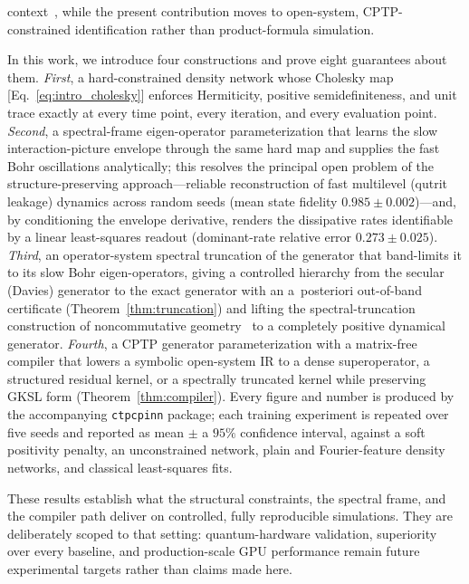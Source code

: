 \documentclass[twocolumn,aps,prxquantum,superscriptaddress,nofootinbib,floatfix,longbibliography]{revtex4-2}
\newcommand{\sync}[1]{#1}
\begin{document}
context~\cite{nguyen2025zassenhaus,jing2026complexity}, while the present contribution moves to open-system, CPTP-constrained identification rather than product-formula simulation.

In this work, we introduce four constructions and prove eight guarantees about them. \emph{First}, a hard-constrained density network whose Cholesky map [Eq.~\eqref{eq:intro_cholesky}] enforces Hermiticity, positive semidefiniteness, and unit trace exactly at every time point, every iteration, and every evaluation point. \emph{Second}, a spectral-frame eigen-operator parameterization that learns the slow interaction-picture envelope through the same hard map and supplies the fast Bohr oscillations analytically; this resolves the principal open problem of the structure-preserving approach---reliable reconstruction of fast multilevel (qutrit leakage) dynamics across random seeds (mean state fidelity $\sync{0.985}\pm\sync{0.002}$)---and, by conditioning the envelope derivative, renders the dissipative rates identifiable by a linear least-squares readout (dominant-rate relative error $\sync{0.273}\pm\sync{0.025}$). \emph{Third}, an operator-system spectral truncation of the generator that band-limits it to its slow Bohr eigen-operators, giving a controlled hierarchy from the secular (Davies) generator to the exact generator with an a~posteriori out-of-band certificate (Theorem~\ref{thm:truncation}) and lifting the spectral-truncation construction of noncommutative geometry~\cite{connes2021spectral,hashimoto2024spectral} to a completely positive dynamical generator. \emph{Fourth}, a CPTP generator parameterization with a matrix-free compiler that lowers a symbolic open-system IR to a dense superoperator, a structured residual kernel, or a spectrally truncated kernel while preserving GKSL form (Theorem~\ref{thm:compiler}). Every figure and number is produced by the accompanying \texttt{ctpcpinn} package; each training experiment is repeated over five seeds and reported as mean $\pm$ a $95\%$ confidence interval, against a soft positivity penalty, an unconstrained network, plain and Fourier-feature density networks, and classical least-squares fits.

These results establish what the structural constraints, the spectral frame, and the compiler path deliver on controlled, fully reproducible simulations. They are deliberately scoped to that setting: quantum-hardware validation, superiority over every baseline, and production-scale GPU performance remain future experimental targets rather than claims made here.
\end{document}
